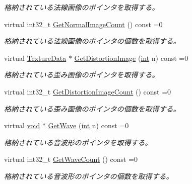 \begin{DoxyCompactItemize}
\begin{DoxyCompactList}\small\item\em 格納されている法線画像のポインタを取得する。 \end{DoxyCompactList}\item 
virtual int32\+\_\+t \mbox{\hyperlink{class_effekseer_1_1_effect_ac83290b7ca5f898b6508fe01821a0ddc}{Get\+Normal\+Image\+Count}} () const =0
\begin{DoxyCompactList}\small\item\em 格納されている法線画像のポインタの個数を取得する。 \end{DoxyCompactList}\item 
virtual \mbox{\hyperlink{struct_effekseer_1_1_texture_data}{Texture\+Data}} $\ast$ \mbox{\hyperlink{class_effekseer_1_1_effect_a846840e790b1b4dff1b5cb8f8bce44dc}{Get\+Distortion\+Image}} (\mbox{\hyperlink{namespace_effekseer_ace0abf7c2e6947e519ebe8b54cbcc30a}{int}} n) const =0
\begin{DoxyCompactList}\small\item\em 格納されている歪み画像のポインタを取得する。 \end{DoxyCompactList}\item 
virtual int32\+\_\+t \mbox{\hyperlink{class_effekseer_1_1_effect_a25718ad6a563549f2b6c12fb70827b38}{Get\+Distortion\+Image\+Count}} () const =0
\begin{DoxyCompactList}\small\item\em 格納されている歪み画像のポインタの個数を取得する。 \end{DoxyCompactList}\item 
virtual \mbox{\hyperlink{namespace_effekseer_ab34c4088e512200cf4c2716f168deb56}{void}} $\ast$ \mbox{\hyperlink{class_effekseer_1_1_effect_a0ae3955ea4f21616c890c5ed2d411eea}{Get\+Wave}} (\mbox{\hyperlink{namespace_effekseer_ace0abf7c2e6947e519ebe8b54cbcc30a}{int}} n) const =0
\begin{DoxyCompactList}\small\item\em 格納されている音波形のポインタを取得する。 \end{DoxyCompactList}\item 
virtual int32\+\_\+t \mbox{\hyperlink{class_effekseer_1_1_effect_af0a2c4cb045d9989619beedd078ff735}{Get\+Wave\+Count}} () const =0
\begin{DoxyCompactList}\small\item\em 格納されている音波形のポインタの個数を取得する。 \end{DoxyCompactList}\item 

\end{DoxyCompactItemize}

